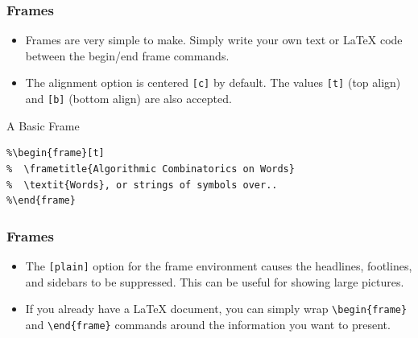 \documentclass[aspectratio=169,utf8]{beamer}
\begin{document}
\begin{frame}[fragile]
  \frametitle{Frames}

  \begin{itemize}
    \setlength{\itemsep}{8pt}
    \item Frames are very simple to make. Simply write your own text or \LaTeX{} code between the begin/end frame commands.
    \item The alignment option is centered \texttt{[c]} by default. The values \texttt{[t]} (top align) and \texttt{[b]} (bottom align) are also accepted.
  \end{itemize}

  \begin{block}{A Basic Frame}
\begin{verbatim}
%\begin{frame}[t]
%  \frametitle{Algorithmic Combinatorics on Words}
%  \textit{Words}, or strings of symbols over..
%\end{frame}
\end{verbatim}
  \end{block}

\end{frame}


\begin{frame}[fragile]
  \frametitle{Frames}

  \begin{itemize}
    \setlength{\itemsep}{8pt}
    \item The \texttt{[plain]} option for the frame environment causes the headlines, footlines, and sidebars to be suppressed. This can be useful for showing large pictures.
    \item If you already have a \LaTeX{} document, you can simply wrap \verb|\begin{frame}| and \verb|\end{frame}| commands around the information you want to present.
  \end{itemize}
\end{frame}
\end{document}
